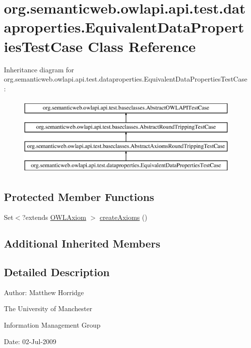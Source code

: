 \hypertarget{classorg_1_1semanticweb_1_1owlapi_1_1api_1_1test_1_1dataproperties_1_1_equivalent_data_properties_test_case}{\section{org.\-semanticweb.\-owlapi.\-api.\-test.\-dataproperties.\-Equivalent\-Data\-Properties\-Test\-Case Class Reference}
\label{classorg_1_1semanticweb_1_1owlapi_1_1api_1_1test_1_1dataproperties_1_1_equivalent_data_properties_test_case}
}
Inheritance diagram for org.\-semanticweb.\-owlapi.\-api.\-test.\-dataproperties.\-Equivalent\-Data\-Properties\-Test\-Case\-:\begin{figure}[H]
\begin{center}
\leavevmode
\includegraphics[height=4.000000cm]{classorg_1_1semanticweb_1_1owlapi_1_1api_1_1test_1_1dataproperties_1_1_equivalent_data_properties_test_case}
\end{center}
\end{figure}
\subsection*{Protected Member Functions}
\begin{DoxyCompactItemize}
\item 
Set$<$?extends \hyperlink{interfaceorg_1_1semanticweb_1_1owlapi_1_1model_1_1_o_w_l_axiom}{O\-W\-L\-Axiom} $>$ \hyperlink{classorg_1_1semanticweb_1_1owlapi_1_1api_1_1test_1_1dataproperties_1_1_equivalent_data_properties_test_case_afa22083fdcfa10100e8bb9873a6f0895}{create\-Axioms} ()
\end{DoxyCompactItemize}
\subsection*{Additional Inherited Members}


\subsection{Detailed Description}
Author\-: Matthew Horridge\par
 The University of Manchester\par
 Information Management Group\par
 Date\-: 02-\/\-Jul-\/2009 

